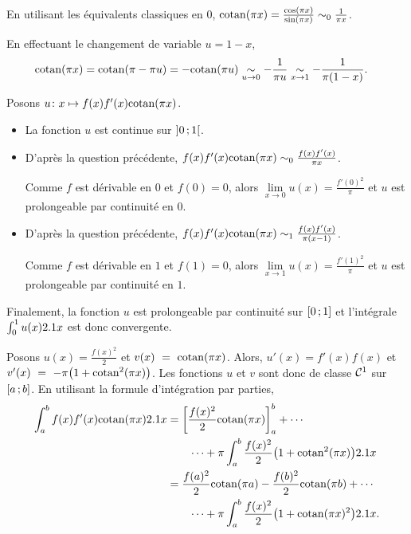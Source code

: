 \begin{solution}
\begin{reponses}
\item En utilisant les équivalents classiques en $0$, $\cotan(\pi x) = \frac{\cos(\pi x)}{\sin(\pi x)} \sim_0 \frac{1}{\pi x}$.


En effectuant le changement de variable $u = 1 - x$,
\begin{align*}
\cotan(\pi x)
&= \cotan(\pi - \pi u)
= - \cotan(\pi u)
\underset{u\to0}{\sim} - \frac{1}{\pi u}
\underset{x\to1}{\sim} -\frac{1}{\pi (1 - x)}.
\end{align*}

\item Posons $\fonctionligne[u]{x}{f(x) f'(x) \cotan(\pi x)}$.
\begin{itemize}
\item La fonction $u$ est continue sur $\interoo{0}{1}$.

\item D'après la question précédente,
$f(x) f'(x) \cotan(\pi x) \sim_0 \frac{f(x) f'(x)}{\pi x}$.

Comme $f$ est dérivable en $0$ et $f(0) = 0$, alors $\lim\limits_{x\to 0} u(x) = \frac{f'(0)^2}{\pi}$ et $u$ est prolongeable par continuité en $0$.

\item D'après la question précédente,
$f(x) f'(x) \cotan(\pi x) \sim_1 \frac{f(x) f'(x)}{\pi (x - 1)}$.

Comme $f$ est dérivable en $1$ et $f(1) = 0$, alors $\lim\limits_{x\to 1} u(x) = \frac{f'(1)^2}{\pi}$ et $u$ est prolongeable par continuité en $1$.
\end{itemize}

Finalement, la fonction $u$ est prolongeable par continuité sur $\interff{0}{1}$ et l'intégrale $\int_0^1 u(x) \d x$ est donc convergente.

\item Posons $u(x) = \frac{f(x)^2}{2}$ et $v(x)~=~\cotan(\pi x)$. Alors, $u'(x) = f'(x) f(x)$ et $v'(x)~=~-\pi \big(1 + \cotan^2(\pi x)\big)$. Les fonctions $u$ et $v$ sont donc de classe $\Cont^1$ sur $\interff{a}{b}$. En utilisant la formule d'intégration par parties,
\begin{align*}
\int_a^b f(x) f'(x) \cotan(\pi x) \d x
&= \left[\frac{f(x)^2}{2} \cotan(\pi x)\right]_a^b + \cdots\\
&\qquad\cdots + \pi \int_a^b \frac{f(x)^2}{2} \big(1 + \cotan^2(\pi x)\big) \d x\\
&= \frac{f(a)^2}{2} \cotan(\pi a) - \frac{f(b)^2}{2} \cotan(\pi b) + \cdots\\
&\qquad\cdots + \pi \int_a^b \frac{f(x)^2}{2} \big(1 + \cotan(\pi x)^2\big) \d x.
\end{align*}


\end{reponses}
\end{solution}
